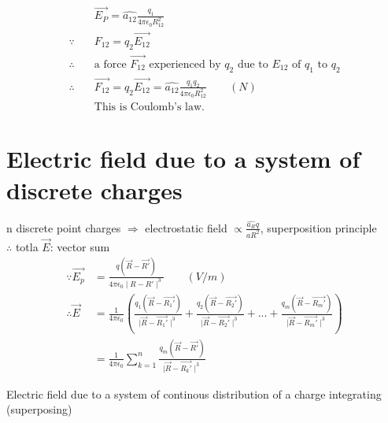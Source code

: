 \documentclass[12pt, a4paper]{article}
\begin{document}
\begin{align*}
	&\vec{E_P} = \hat{a_{12}} \frac{q_1}{4 \pi \epsilon_0 R_{12}^2} \\
	\because \quad&F_{12} = q_2 \vec{E_{12}} \\
	\therefore \quad&\text{a force } \vec{F_{12}} \text{ experienced by } q_2 \text { due to } E_{12} \text{ of } q_1 \text{ to } q_2 \\
	\therefore \quad &\vec{F_{12}} = q_2 \vec{E_{12}} = \hat{a_{12}} \frac{q_1 q_2}{4 \pi \epsilon_0 R_{12}^2} \qquad (N) \\
	&\text{This is Coulomb's law.}
\end{align*}
\newpage

\section*{Electric field due to a system of discrete charges}
n discrete point charges
$\Rightarrow$ electrostatic field $\propto \frac{\hat{a_R}q}{aR^2}$, superposition principle \\
$\therefore$ totla $\vec{E}$: vector sum
\begin{align*}
	\because \vec{E_p} &= \frac{q(\vec{R} - \vec{R'})}{4 \pi \epsilon_0 \mid R - R' \mid^3} \qquad (V/m) \\
	\therefore \vec{E} &= \frac{1}{4 \pi \epsilon_0} \left(\frac{q_1(\vec{R} - \vec{R_1'})}{\mid \vec{R} - \vec{R_1'} \mid^3} + \frac{q_2(\vec{R} - \vec{R_2'})}{\mid \vec{R} - \vec{R_2'} \mid^3} + ... + \frac{q_m(\vec{R} - \vec{R_m'})}{\mid \vec{R} - \vec{R_m'} \mid^3}\right) \\
	&= \frac{1}{4 \pi \epsilon_0} \sum_{k=1}^{n} \frac{q_m(\vec{R} - \vec{R'})}{\mid \vec{R} - \vec{R_k'} \mid^3}
\end{align*}

Electric field due to a system of continous distribution of a charge integrating (superposing)
\end{document}
